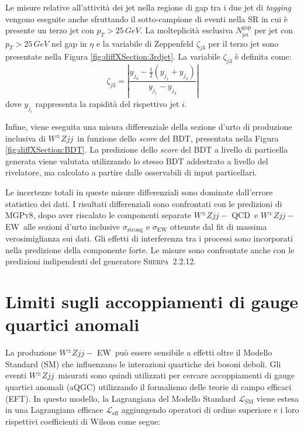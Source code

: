 \documentclass[11pt]{article}
\newcommand{\wzjjew}{$W^\pm Z jj-$ EW}
\newcommand{\wzjjqcd}{$W^\pm Z jj-$ QCD}
\newcommand{\wzjj}{$W^\pm Z jj$}
\begin{document}
Le misure relative all'attività dei jet nella regione di gap tra i due jet di \textit{tagging} vengono eseguite anche sfruttando il sotto-campione di eventi nella SR in cui è presente un terzo jet con $p_T > 25\,\unit{GeV}$. La molteplicità esclusiva $N_{\text{jet}}^{\text{gap}}$ per jet con $p_T > 25\,\unit{GeV}$ nel gap in $\eta$ e la variabile di Zeppenfeld $\zeta_{j3}$ per il terzo jet sono presentate nella Figura \ref{fig:diffXSection:3rdjet}. La variabile $\zeta_{j3}$ è definita come:
\begin{equation}
\zeta_{j3} = \left| \frac{y_{j_3} - \frac{1}{2}\left(y_{j_1} + y_{j_2}\right)}{y_{j_1} - y_{j_2}} \right|
\end{equation}
dove $y_{j_i}$ rappresenta la rapidità del rispettivo jet $i$.

Infine, viene eseguita una misura differenziale della sezione d'urto di produzione inclusiva di \wzjj\ in funzione dello \textit{score} del BDT, presentata nella Figura \ref{fig:diffXSection:BDT}. La predizione dello \textit{score} del BDT a livello di particella generata viene valutata utilizzando lo stesso BDT addestrato a livello del rivelatore, ma calcolato a partire dalle osservabili di input particellari.

Le incertezze totali in queste misure differenziali sono dominate dall'errore statistico dei dati. I risultati differenziali sono confrontati con le predizioni di \textsc{MGPy8}, dopo aver riscalato le componenti separate \wzjjqcd\ e \wzjjew\ alle sezioni d'urto inclusive $\sigma_{\text{strong}}$ e $\sigma_{\text{EW}}$ ottenute dal fit di massima verosimiglianza sui dati. Gli effetti di interferenza tra i processi sono incorporati nella predizione della componente forte. Le misure sono confrontate anche con le predizioni indipendenti del generatore \textsc{Sherpa}~2.2.12.
\newpage
\section{Limiti sugli accoppiamenti di gauge quartici anomali}
\label{sec:EFT_limits}

La produzione \wzjjew\ può essere sensibile a effetti oltre il Modello Standard (SM) che influenzano le interazioni quartiche dei bosoni deboli. Gli eventi \wzjj\ misurati sono quindi utilizzati per cercare accoppiamenti di gauge quartici anomali (aQGC) utilizzando il formalismo delle teorie di campo efficaci (EFT). In questo modello, la Lagrangiana del Modello Standard $\mathcal{L}_{\mathrm{SM}}$ viene estesa in una Lagrangiana efficace $\mathcal{L}_{\mathrm{eff}}$ aggiungendo operatori di ordine superiore e i loro rispettivi coefficienti di Wilson come segue:
\end{document}
